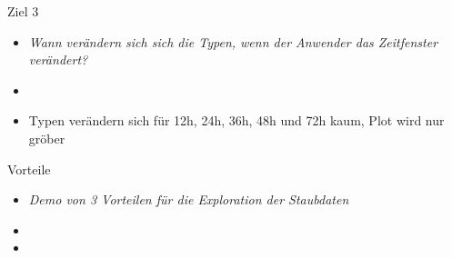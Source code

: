 \documentclass{beamer}
\begin{document}
    \begin{frame}{Ziel 3}
    	\begin{itemize}
    		\setlength\itemsep{1em}
    		\item[] \textit{Wann verändern sich sich die Typen, wenn der Anwender das Zeitfenster verändert?}
    		\item[]
    		\item Typen verändern sich für 12h, 24h, 36h, 48h und 72h kaum, Plot wird nur gröber
    	\end{itemize}
    \end{frame}

    \begin{frame}{Vorteile}
    	\begin{itemize}
    		\setlength\itemsep{1em}
    		\item[] \textit{Demo von 3 Vorteilen für die Exploration der Staubdaten}
    		\item[]
    		\item
    	\end{itemize}
    \end{frame}

\end{document}
